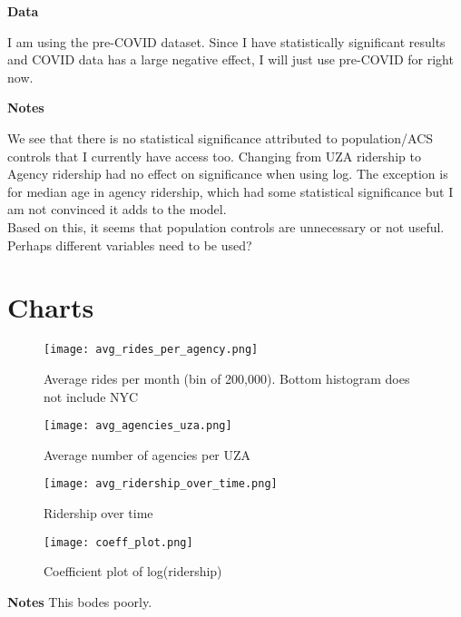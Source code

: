 \documentclass [11pt]{article}
\begin{document}
\textbf{Data}

I am using the pre-COVID dataset. Since I have statistically significant results and COVID data has a large negative effect, I will just use pre-COVID for right now.

\textbf{Notes}

We see that there is no statistical significance attributed to population/ACS controls that I currently have access too. Changing from UZA ridership to Agency ridership had no effect on significance when using log. The exception is for median age in agency ridership, which had some statistical significance but I am not convinced it adds to the model.\\
Based on this, it seems that population controls are unnecessary or not useful. Perhaps different variables need to be used?

\newpage
\section*{Charts}
\begin{figure}[H]
    \centering
    \texttt{[image: avg\_rides\_per\_agency.png]} %
    \caption{Average rides per month (bin of 200,000). Bottom histogram does not include NYC}
\end{figure}
\begin{figure}[H]
    \centering
    \texttt{[image: avg\_agencies\_uza.png]} %
    \caption{Average number of agencies per UZA}
\end{figure}
\begin{figure}[H]
    \centering
    \texttt{[image: avg\_ridership\_over\_time.png]} %
    \caption{Ridership over time}
\end{figure}
\begin{figure}[H]
    \centering
    \texttt{[image: coeff\_plot.png]} %
    \caption{Coefficient plot of log(ridership)}
\end{figure}
\textbf{Notes}
This bodes poorly.
\end{document}

